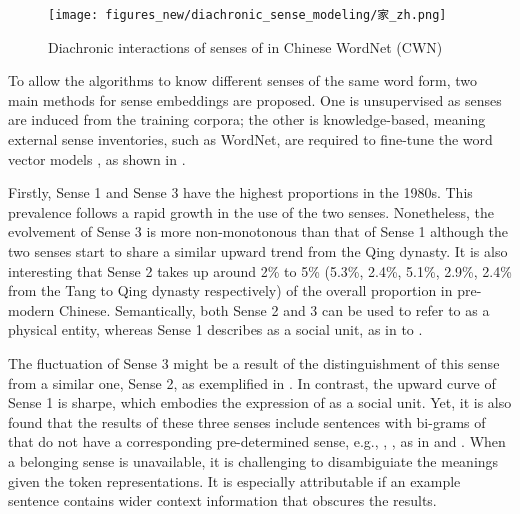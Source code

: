 \begin{figure}[H]
  \centering
  \texttt{[image: figures\_new/diachronic\_sense\_modeling/家\_zh.png]}
  \caption{Diachronic interactions of senses of \jia in Chinese WordNet (CWN)}
  \label{fig:jia_polynomial}
\end{figure}

To allow the algorithms to know different senses of the same word form, two main methods for sense embeddings are proposed. One is unsupervised as senses are induced from the training corpora; the other is knowledge-based, meaning external sense inventories, such as WordNet, are required to fine-tune the word vector models \parencite{camacho2018survey,pelevina2017making}, as shown in .

Firstly, Sense 1 and Sense 3 have the highest proportions in the 1980s. This prevalence follows a rapid growth in the use of the two senses. Nonetheless, the evolvement of Sense 3 is more non-monotonous than that of Sense 1 although the two senses start to share a similar upward trend from the Qing dynasty. It is also interesting that Sense 2 takes up around 2\% to 5\% (5.3\%, 2.4\%, 5.1\%, 2.9\%, 2.4\% from the Tang to Qing dynasty respectively) of the overall proportion in pre-modern Chinese. Semantically, both Sense 2 and 3 can be used to refer to \jia as a physical entity, whereas Sense 1 describes \jia as a social unit, as in  to . 

The fluctuation of Sense 3 might be a result of the distinguishment of this sense from a similar one, Sense 2, as exemplified in .  In contrast, the upward curve of Sense 1 is sharpe, which embodies the expression of \jia as a social unit. Yet, it is also found that the results of these three senses include sentences with bi-grams of \jia that do not have a corresponding pre-determined sense, e.g., , , as in  and . When a belonging sense is unavailable, it is challenging to disambiguiate the meanings given the token representations. It is especially attributable if an example sentence contains wider context information that obscures the results.

